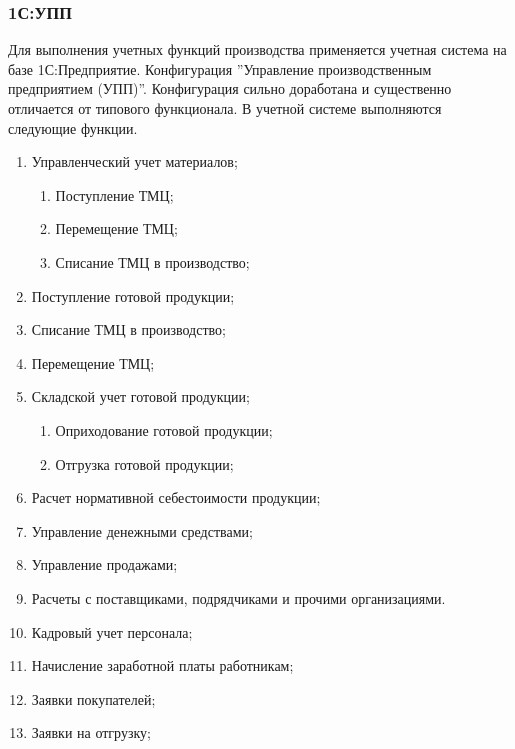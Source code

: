 \subsubsection{1С:УПП}


Для выполнения учетных функций производства применяется учетная система на
базе 1С:Предприятие. Конфигурация ''Управление производственным предприятием (УПП)''. 
Конфигурация сильно доработана и существенно отличается от типового функционала.
В учетной системе выполняются следующие функции.


\begin{enumerate}
\item Управленческий учет материалов;
\begin{enumerate}
\item Поступление ТМЦ;
\item Перемещение ТМЦ;
\item Списание ТМЦ в производство;
\end{enumerate}
\item Поступление готовой продукции;
\item Списание ТМЦ в производство;
\item Перемещение ТМЦ;
\item Складской учет готовой продукции;
\begin{enumerate}
\item Оприходование готовой продукции;
\item Отгрузка готовой продукции;
\end{enumerate}
\item Расчет нормативной себестоимости продукции;
\item Управление денежными средствами;
\item Управление продажами;
\item Расчеты с поставщиками, подрядчиками и прочими организациями.
\item Кадровый учет персонала;
\item Начисление заработной платы работникам;
\item Заявки покупателей;
\item Заявки на отгрузку;


\end{enumerate}
